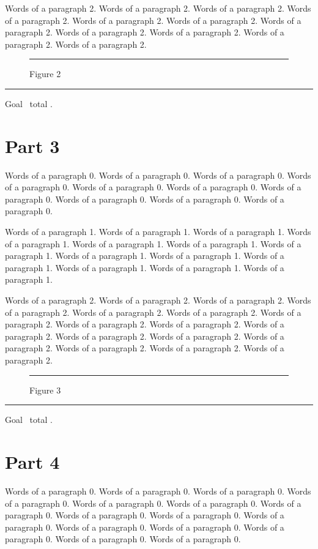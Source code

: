 \documentclass{article}
\begin{document}
Words of a paragraph 2. Words of a paragraph 2. Words of a paragraph 2. Words of a paragraph 2. Words of a paragraph 2. Words of a paragraph 2. Words of a paragraph 2. Words of a paragraph 2. Words of a paragraph 2. Words of a paragraph 2. Words of a paragraph 2. 

\begin{figure}[htbp]\centering\rule{140pt}{134pt}\caption{Figure 2}\end{figure}
\noindent\rule{\linewidth}{0.4pt}\par Goal \the\pagegoal\ total \the\pagetotal.

\section{Part 3}
Words of a paragraph 0. Words of a paragraph 0. Words of a paragraph 0. Words of a paragraph 0. Words of a paragraph 0. Words of a paragraph 0. Words of a paragraph 0. Words of a paragraph 0. Words of a paragraph 0. Words of a paragraph 0. 

Words of a paragraph 1. Words of a paragraph 1. Words of a paragraph 1. Words of a paragraph 1. Words of a paragraph 1. Words of a paragraph 1. Words of a paragraph 1. Words of a paragraph 1. Words of a paragraph 1. Words of a paragraph 1. Words of a paragraph 1. Words of a paragraph 1. Words of a paragraph 1. 

Words of a paragraph 2. Words of a paragraph 2. Words of a paragraph 2. Words of a paragraph 2. Words of a paragraph 2. Words of a paragraph 2. Words of a paragraph 2. Words of a paragraph 2. Words of a paragraph 2. Words of a paragraph 2. Words of a paragraph 2. Words of a paragraph 2. Words of a paragraph 2. Words of a paragraph 2. Words of a paragraph 2. Words of a paragraph 2. 

\begin{figure}[tp]\centering\rule{160pt}{171pt}\caption{Figure 3}\end{figure}
\noindent\rule{\linewidth}{0.4pt}\par Goal \the\pagegoal\ total \the\pagetotal.

\section{Part 4}
Words of a paragraph 0. Words of a paragraph 0. Words of a paragraph 0. Words of a paragraph 0. Words of a paragraph 0. Words of a paragraph 0. Words of a paragraph 0. Words of a paragraph 0. Words of a paragraph 0. Words of a paragraph 0. Words of a paragraph 0. Words of a paragraph 0. Words of a paragraph 0. Words of a paragraph 0. Words of a paragraph 0. 
\end{document}
